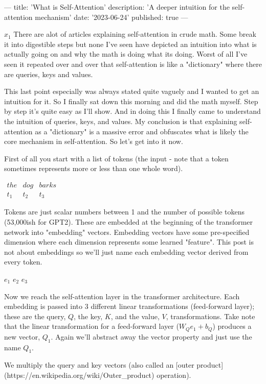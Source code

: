 ---
title: 'What is Self-Attention'
description: 'A deeper intuition for the self-attention mechanism'
date: '2023-06-24'
published: true
---

$ x_1 $
There are alot of articles explaining self-attention in crude math. Some break it into digestible steps but none I've seen have depicted an intuition into what is actually going on and why the math is doing what its doing. Worst of all I've seen it repeated over and over that self-attention is like a "dictionary" where there are queries, keys and values.

This last point especially was always stated quite vaguely and I wanted to get an intuition for it. So I finally sat down this morning and did the math myself. Step by step it's quite easy as I'll show. And in doing this I finally came to understand the intuition of queries, keys, and values. My conclusion is that explaining self-attention as a "dictionary" is a massive error and obfuscates what is likely the core mechanism in self-attention. So let's get into it now.

First of all you start with a list of tokens (the input - note that a token sometimes represents more or less than one whole word).

$
\begin{array}{ccc}
    the & dog & barks \\
    t_1 & t_2 & t_3
\end{array}
$

Tokens are just scalar numbers between 1 and the number of possible tokens (53,000ish for GPT2). These are embedded at the beginning of the transformer network into "embedding" vectors. Embedding vectors have some pre-specified dimension where each dimension represents some learned "feature". This post is not about embeddings so we'll just name each embedding vector derived from every token.

$e_1$ $e_2$ $e_3$

Now we reach the self-attention layer in the transformer architecture. Each embedding is passed into 3 different linear transformations (feed-forward layer); these are the query, $Q$, the key, $K$, and the value, $V$, transformations. Take note that the linear transformation for a feed-forward layer ($W_Q e_1 + b_Q$) produces a new vector, $Q_1$. Again we'll abstract away the vector property and just use the name $Q_1$.

We multiply the query and key vectors (also called an [outer product](https://en.wikipedia.org/wiki/Outer_product) operation).

